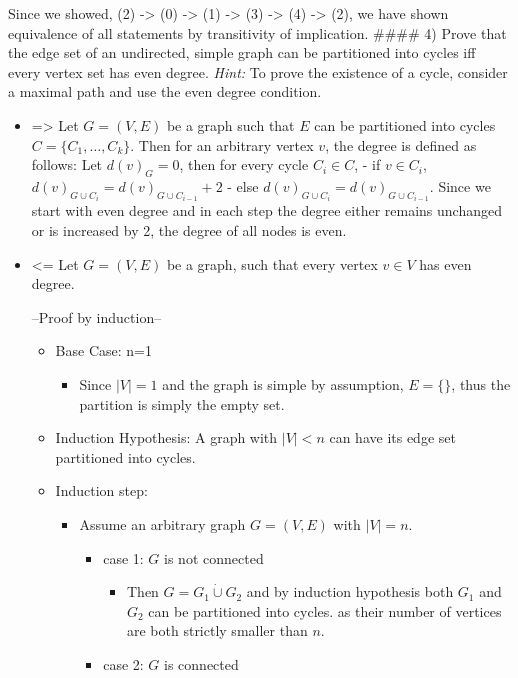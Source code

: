 \documentclass[
]{article}
\providecommand{\tightlist}{%
  \setlength{\itemsep}{0pt}\setlength{\parskip}{0pt}}
\begin{document}
Since we showed, (2) -\textgreater{} (0) -\textgreater{} (1)
-\textgreater{} (3) -\textgreater{} (4) -\textgreater{} (2), we have
shown equivalence of all statements by transitivity of implication.
\#\#\#\# 4) Prove that the edge set of an undirected, simple graph can
be partitioned into cycles iff every vertex set has even degree.
\emph{Hint:} To prove the existence of a cycle, consider a maximal path
and use the even degree condition.

\begin{itemize}
\item
  =\textgreater{} Let \(G = (V,E)\) be a graph such that \(E\) can be
  partitioned into cycles \(C = \{C_1, \dots, C_k\}\). Then for an
  arbitrary vertex \(v\), the degree is defined as follows: Let
  \(d(v)_G = 0\), then for every cycle \(C_i \in C\), - if
  \(v \in C_i\), \(d(v)_{G \cup C_i} = d(v)_{G \cup C_{i-1}} + 2\) -
  else \(d(v)_{G \cup C_i} = d(v)_{G \cup C_{i-1}}\). Since we start
  with even degree and in each step the degree either remains unchanged
  or is increased by 2, the degree of all nodes is even.
\item
  \textless= Let \(G = (V,E)\) be a graph, such that every vertex
  \(v \in V\) has even degree.

  --Proof by induction--

  \begin{itemize}
  \tightlist
  \item
    Base Case: n=1

    \begin{itemize}
    \tightlist
    \item
      Since \(|V| = 1\) and the graph is simple by assumption,
      \(E = \{\}\), thus the partition is simply the empty set.
    \end{itemize}
  \item
    Induction Hypothesis: A graph with \(|V| < n\) can have its edge set
    partitioned into cycles.
  \item
    Induction step:

    \begin{itemize}
    \tightlist
    \item
      Assume an arbitrary graph \(G = (V,E)\) with \(|V| = n\).

      \begin{itemize}
      \tightlist
      \item
        case 1: \(G\) is not connected

        \begin{itemize}
        \tightlist
        \item
          Then \(G = G_1 \dot \cup G_2\) and by induction hypothesis
          both \(G_1\) and \(G_2\) can be partitioned into cycles. as
          their number of vertices are both strictly smaller than \(n\).
        \end{itemize}
      \item
        case 2: \(G\) is connected


\end{itemize}
\end{itemize}
\end{itemize}
\end{itemize}
\end{document}
